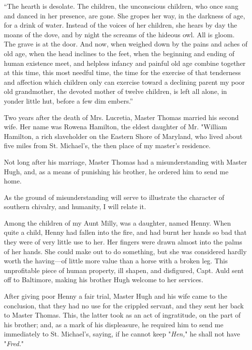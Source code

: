 ``The hearth is desolate. The children, the unconscious children, who
once sang and danced in her presence, are gone. She gropes her way, in
the darkness of age, for a drink of water. Instead of the voices of her
children, she hears by day the moans of the dove, and by night the
screams of the hideous owl. All is gloom. The grave is at the door. And
now, when weighed down by the pains and aches of old age, when the head
inclines to the feet, when the beginning and ending of human existence
meet, and helpless infancy and painful old age combine together at this
time, this most needful time, the time for the exercise of that
tenderness and affection which children only can exercise toward a
declining parent my poor old grandmother, the devoted mother of twelve
children, is left all alone, in yonder little hut, before a few dim
embers.''

Two years after the death of Mrs. Lucretia, Master Thomas married his
second wife. Her name was Rowena Hamilton, the eldest daughter of Mr.
"William Hamilton, a rich slaveholder on the Eastern Shore of Maryland,
who lived about five miles from St. Michael's, the then place of my
master's residence.

Not long after his marriage, Master Thomas had a
{\protect\hypertarget{182}{}{}}misunderstanding with Master Hugh, and,
as a means of punishing his brother, he ordered him to send me home.

As the ground of misunderstanding will serve to illustrate the character
of southern chivalry, and humanity, I will relate it.

Among the children of my Aunt Milly, was a daughter, named Henny. When
quite a child, Henny had fallen into the fire, and had burnt her hands
so bad that they were of very little use to her. Her fingers were drawn
almost into the palms of her hands. She could make out to do something,
but she was considered hardly worth the having---of little more value
than a horse with a broken leg. This unprofitable piece of human
property, ill shapen, and disfigured, Capt. Auld sent off to Baltimore,
making his brother Hugh welcome to her services.

After giving poor Henny a fair trial, Master Hugh and his wife came to
the conclusion, that they had no use for the crippled servant, and they
sent her back to Master Thomas. This, the latter took as an act of
ingratitude, on the part of his brother; and, as a mark of his
displeasure, he required him to send me immediately to St. Michael's,
saying, if he cannot keep "\emph{Hen,}" he shall not have "\emph{Fred.}"

